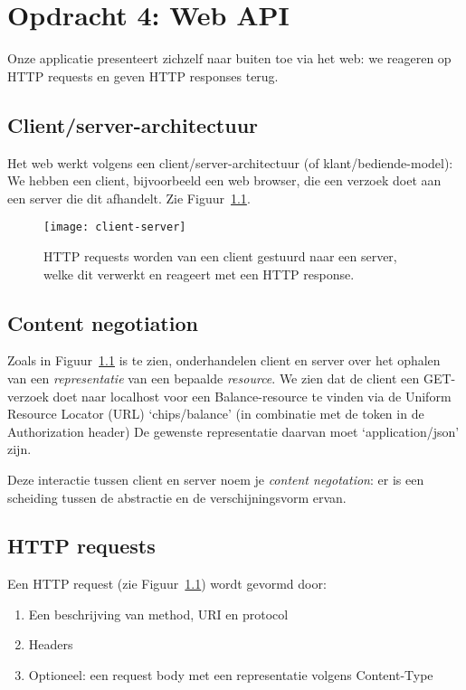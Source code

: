 \chapter{Opdracht 4: Web API}
Onze applicatie presenteert zichzelf naar buiten toe via het web:
we reageren op HTTP requests en geven HTTP responses terug.

\section{Client/server-architectuur}
Het web werkt volgens een client/server-architectuur (of klant/bediende-model):
We hebben een client, bijvoorbeeld een web browser, die een verzoek doet 
aan een server die dit afhandelt. Zie Figuur~\ref{fig:client-server}.

\begin{figure}[H]
    \centering
    \texttt{[image: client-server]}
    \caption{HTTP requests worden van een client gestuurd naar een server, welke dit verwerkt en reageert met een HTTP response.}
    \label{fig:client-server}
\end{figure}

\section{Content negotiation}
Zoals in Figuur~\ref{fig:client-server} is te zien, 
onderhandelen client en server over het ophalen van een \textit{representatie}
van een bepaalde \textit{resource}. We zien dat de client een 
GET-verzoek doet naar localhost voor een Balance-resource te
vinden via de Uniform Resource Locator (URL) `chips/balance'
(in combinatie met de token in de Authorization header)
De gewenste representatie daarvan moet `application/json' zijn.

Deze interactie tussen client en server noem je \textit{content negotation}:
er is een scheiding tussen de abstractie en de verschijningsvorm ervan.

\section{HTTP requests}
Een HTTP request (zie Figuur~\ref{fig:client-server}) wordt gevormd door:
\begin{enumerate}
    \item Een beschrijving van method, URI en protocol
    \item Headers
    \item Optioneel: een request body met een representatie volgens Content-Type
\end{enumerate}

